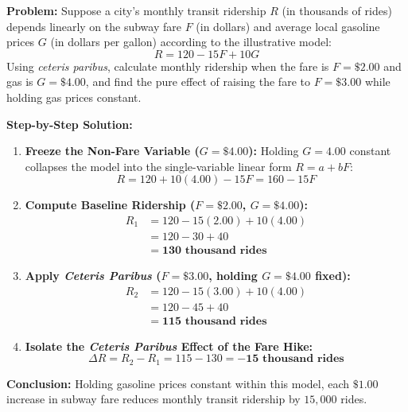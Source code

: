 \documentclass[11pt,letterpaper]{article}
\begin{document}
\begin{tcolorbox}[colback=CourseBlue!5!white,colframe=CourseBlue!80!black,title=\textbf{Work It Out: Applying \textit{Ceteris Paribus} to Public Transit Ridership}]
\textbf{Problem:} Suppose a city's monthly transit ridership $R$ (in thousands of rides) depends linearly on the subway fare $F$ (in dollars) and average local gasoline prices $G$ (in dollars per gallon) according to the illustrative model:
\[
R = 120 - 15F + 10G
\]
Using \emph{ceteris paribus}, calculate monthly ridership when the fare is $F = \$2.00$ and gas is $G = \$4.00$, and find the pure effect of raising the fare to $F = \$3.00$ while holding gas prices constant.

\medskip
\noindent\textbf{Step-by-Step Solution:}
\begin{enumerate}
    \item \textbf{Freeze the Non-Fare Variable ($G = \$4.00$):}
    Holding $G = 4.00$ constant collapses the model into the single-variable linear form $R = a + bF$:
    \[
    R = 120 + 10(4.00) - 15F = 160 - 15F
    \]

    \item \textbf{Compute Baseline Ridership ($F = \$2.00$, $G = \$4.00$):}
    \[
    \begin{aligned}
    R_1 &= 120 - 15(2.00) + 10(4.00) \\
        &= 120 - 30 + 40 \\
        &= \mathbf{130\text{ thousand rides}}
    \end{aligned}
    \]

    \item \textbf{Apply \textit{Ceteris Paribus} ($F = \$3.00$, holding $G = \$4.00$ fixed):}
    \[
    \begin{aligned}
    R_2 &= 120 - 15(3.00) + 10(4.00) \\
        &= 120 - 45 + 40 \\
        &= \mathbf{115\text{ thousand rides}}
    \end{aligned}
    \]

    \item \textbf{Isolate the \textit{Ceteris Paribus} Effect of the Fare Hike:}
    \[
    \Delta R = R_2 - R_1 = 115 - 130 = \mathbf{-15\text{ thousand rides}}
    \]
\end{enumerate}
\textbf{Conclusion:} Holding gasoline prices constant within this model, each $\$1.00$ increase in subway fare reduces monthly transit ridership by $15{,}000$ rides.
\end{tcolorbox}
\end{document}
